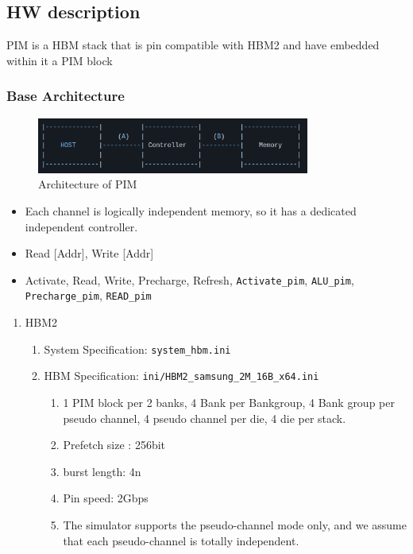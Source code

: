 \documentclass[12pt]{article}
\begin{document}
\subsection{HW description}
PIM is a HBM stack that is pin compatible with HBM2 and have embedded within it a PIM block

\subsubsection{Base Architecture}

\begin{figure}[h]
	\centering
	\includegraphics[width=0.8\textwidth]{Images/img2.png}
	\caption{Architecture of PIM}
	\label{fig:Architecture of PIM}
\end{figure}

\begin{itemize}
	\item Each channel is logically independent memory, so it has a dedicated independent controller.
	\item Read [Addr], Write [Addr]
	\item Activate, Read, Write, Precharge, Refresh, \texttt{Activate\_pim}, \texttt{ALU\_pim}, \texttt{Precharge\_pim}, \texttt{READ\_pim}
\end{itemize}


\begin{enumerate}
	\item HBM2
	\begin{enumerate}
		\item System Specification: \texttt{system\_hbm.ini}
		\item HBM Specification: \texttt{ini/HBM2\_samsung\_2M\_16B\_x64.ini}
		\begin{enumerate}
			\item 1 PIM block per 2 banks, 4 Bank per Bankgroup, 4 Bank group per pseudo channel, 4 pseudo channel per die, 4 die per stack.
			
			\item Prefetch size : 256bit
			
			\item burst length: 4n
			
			\item Pin speed: 2Gbps
			
			\item The simulator supports the pseudo-channel mode only, and we assume that each pseudo-channel is totally independent.
		\end{enumerate}
	\end{enumerate}
\end{enumerate}
\end{document}
